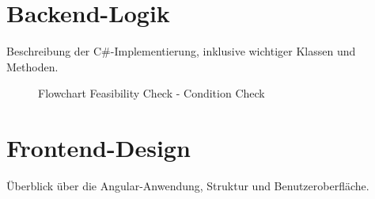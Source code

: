 \section{Backend-Logik}
Beschreibung der C\#-Implementierung, inklusive wichtiger Klassen und Methoden.

\begin{figure}[!h]
    \centering
    \caption{Flowchart Feasibility Check - Condition Check }
    \label{fig:feasibility-check-condition-check}
\end{figure}

\section{Frontend-Design}
Überblick über die Angular-Anwendung, Struktur und Benutzeroberfläche.